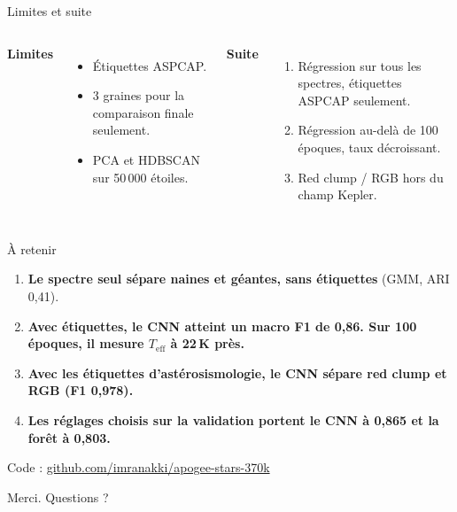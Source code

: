 \documentclass[aspectratio=169,11pt]{beamer}
\newcommand{\teff}{$T_{\mathrm{eff}}$}
\begin{document}
\begin{frame}{Limites et suite}
\begin{columns}[T]
\textbf{Limites}
\begin{itemize}
  \item Étiquettes ASPCAP.
  \item 3 graines pour la comparaison finale seulement.
  \item PCA et HDBSCAN sur 50\,000 étoiles.
\end{itemize}
\textbf{Suite}
\begin{enumerate}
  \item Régression sur tous les spectres, étiquettes ASPCAP seulement.
  \item Régression au-delà de 100 époques, taux décroissant.
  \item Red clump / RGB hors du champ Kepler.
\end{enumerate}
\end{columns}
\end{frame}

\begin{frame}{À retenir}
\begin{enumerate}
  \setlength{\itemsep}{1em}
  \item \textbf{Le spectre seul sépare naines et géantes, sans étiquettes} (GMM, ARI 0,41).
  \item \textbf{Avec étiquettes, le CNN atteint un macro F1 de 0,86. Sur 100 époques, il mesure \teff{} à 22\,K près.}
  \item \textbf{Avec les étiquettes d'astérosismologie, le CNN sépare red clump et RGB (F1 0,978).}
  \item \textbf{Les réglages choisis sur la validation portent le CNN à 0,865 et la forêt à 0,803.}
\end{enumerate}
\vspace{1.5em}
\small Code : \url{github.com/imranakki/apogee-stars-370k}
\end{frame}

\begin{frame}[standout]
Merci. Questions ?
\end{frame}
\end{document}

